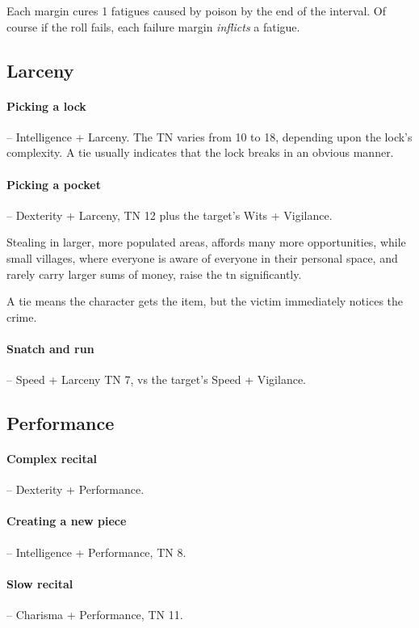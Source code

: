 \begin{multicols}{2}
Each margin cures 1 \glspl{fatigue} caused by poison by the end of the interval.
Of course if the roll fails, each failure margin \emph{inflicts} a \gls{fatigue}.

\subsection{Larceny}

\paragraph{Picking a lock} -- Intelligence + Larceny.
The TN varies from 10 to 18, depending upon the lock's complexity.
A tie usually indicates that the lock breaks in an obvious manner.

\paragraph{Picking a pocket} -- Dexterity + Larceny, TN 12 plus the target's Wits + Vigilance.

Stealing in larger, more populated areas, affords many more opportunities, while small villages, where everyone is aware of everyone in their personal space, and rarely carry larger sums of money, raise the \gls{tn} significantly.

A tie means the character gets the item, but the victim immediately notices the crime.

\paragraph{Snatch and run} -- Speed + Larceny TN 7, vs the target's Speed + Vigilance.

\subsection{Performance}

\paragraph{Complex recital} -- Dexterity + Performance.

\paragraph{Creating a new piece} -- Intelligence + Performance, TN 8.

\paragraph{Slow recital} -- Charisma + Performance, TN 11.


\end{multicols}
